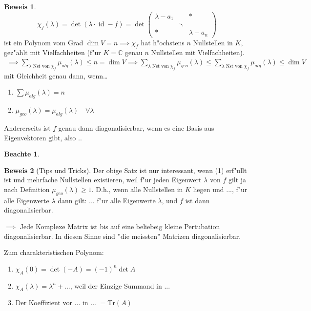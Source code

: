\documentclass[oneside,fontsize=11pt,paper=a4,BCOR=0mm,DIV=12,automark,headsepline]{scrbook}
\DeclareMathOperator{\mId}{id}
\theoremstyle{remark}
\theoremstyle{definition}
\newtheorem*{notte}{Beachte}
\theoremstyle{definition}
\newtheorem*{prof}{Beweis}
\theoremstyle{remark}
\begin{document}
\begin{prof}
  \[\chi_f(\lambda) = \det(\lambda\cdot\mId - f) = \det
    \begin{pmatrix}
      \lambda - a_1 & & * \\
      & \ddots & \\
      * & & \lambda - a_n
    \end{pmatrix}
  \] ist ein Polynom vom Grad $\dim V = n \implies \chi_f$ hat h"ochstens $n$ Nullstellen in $K$, gez"ahlt mit Vielfachheiten (f"ur \(K = \mathbb{C}\) genau \(n\) Nullstellen mit Vielfachheiten).
  \begin{align*}
    \implies \sum_{\lambda \text{ Nst von } \chi_f}\mu_{alg}(\lambda) \leq n = \dim V \implies \sum_{\lambda\text{ Nst von }\chi_f} \mu_{geo}(\lambda) \leq \sum_{\lambda\text{ Nst von }\chi_f}\mu_{alg}(\lambda) \leq \dim V
  \end{align*}
  mit Gleichheit genau dann, wenn\dots
  \begin{enumerate}
  \item \(\sum\mu_{alg}(\lambda) = n\)
  \item \(\mu_{geo}(\lambda) = \mu_{alg}(\lambda) \quad\forall\lambda\)
  \end{enumerate}

  Andererseits ist $f$ genau dann diagonalisierbar, wenn es eine Basis aus
  Eigenvektoren gibt, also ..
\end{prof}

\begin{notte}
  \begin{prof}[Tips und Tricks]
    Der obige Satz ist nur interessant, wenn (1) erf"ullt ist und mehrfache
    Nullstellen existieren, weil f"ur jeden Eigenwert $\lambda$ von $f$ gilt ja
    nach Definition $\mu_{geo}(\lambda)\geq 1$. D.h., wenn alle Nullstellen in
    $K$ liegen und ..., f"ur alle Eigenwerte $\lambda$ dann gilt: ... f"ur alle
    Eigenwerte $\lambda$, und $f$ ist dann diagonalisierbar.

    $\implies$ Jede Komplexe Matrix ist bis auf eine beliebeig kleine
    Pertubation diagonalisierbar. In diesen Sinne sind ''die meissten'' Matrizen diagonalisierbar.
  \end{prof}
\end{notte}

Zum charakteristischen Polynom:
\begin{relation}
  \begin{enumerate}
  \item $\chi_A(0) = \det (-A) = (-1)^n \det A$
  \item $\chi_A (\lambda) = \lambda^n + ...$, weil der Einzige Summand in ...
  \item Der Koeffizient vor ... in ... \(=\text{Tr}(A)\)
  \end{enumerate}
\end{relation}
\end{document}
